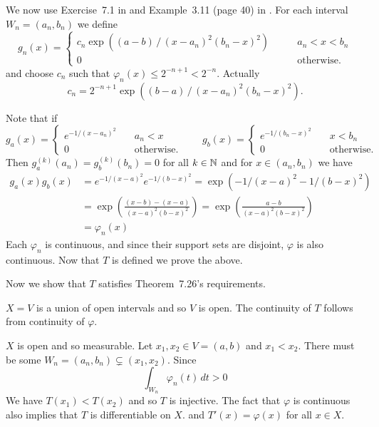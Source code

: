 \begin{enumerate}
We now use Exercise~7.1 in \cite{RudinPMA85}
and  Example~3.11 (page 40) in \cite{Gelb1996}.
For each interval \(W_n = (a_n,b_n)\) we define 
\begin{equation*}
g_n(x) = \left\{\begin{array}{ll}
c_n\exp\left((a-b) \,/\, (x-a_n)^2(b_n-x)^2\right) \qquad & a_n < x < b_n \\
0  & \mathrm{otherwise}.
\end{array}
\right.
\end{equation*}
and choose \(c_n\) such that \(\varphi_n(x) \leq  2^{-n+1 } < 2^{-n}\).
Actually 
\begin{equation*}
c_n =   2^{-n+1 } \exp\left((b-a) \,/\, (x-a_n)^2(b_n-x)^2\right).
\end{equation*}

Note that if
\begin{equation*}
g_a(x) = 
\left\{
\begin{array}{ll}
e^{-1/(x-a_n)^2} \quad & a_n < x  \\
0  & \mathrm{otherwise}.
\end{array}\right.
\qquad
g_b(x) = 
\left\{
\begin{array}{ll}
e^{-1/(b_n-x)^2} \quad &  x < b_n \\
0  & \mathrm{otherwise}.
\end{array}\right.
\end{equation*}
Then \(g_a^{(k)}(a_n) = g_b^{(k)}(b_n) = 0\) for all \(k\in\mathbb{N}\)
and for \(x\in (a_n,b_n)\) we have
\begin{align*}
g_a(x)g_b(x) 
&= e^{-1/(x-a)^2} e^{-1/(b-x)^2} 
 = \exp\left(- 1/(x-a)^2 - 1/(b-x)^2\right) \\
&= \exp\left(\frac{(x-b) - (x-a)}{(x-a)^2 (b-x)^2}\right)
 = \exp\left(\frac{a-b}{(x-a)^2 (b-x)^2}\right) \\
&= \varphi_n(x)
\end{align*}
Each \(\varphi_n\) is continuous, and since their support sets
are disjoint, \(\varphi\) is also continuous.
Now that $T$ is defined we prove the above.
\begin{itemize}


Now we show that $T$
satisfies Theorem~7.26's requirements.
\begin{itemize}

\(X=V\) is a union of open intervals and so $V$ is open.
The continuity of $T$ follows from continuity of \(\varphi\).

$X$ is open and so measurable.
Let \(x_1,x_2\in V=(a,b)\) and  \(x_1 < x_2\).
There must be some \(W_n = (a_n,b_n) \subsetneq (x_1,x_2)\).
Since 
\begin{equation*}
\int_{W_n} \varphi_n(t)\,dt > 0
\end{equation*}
We have \(T(x_1) < T(x_2)\) and so $T$ is injective.
The fact that \(\varphi\) is continuous
also implies that $T$ is differentiable on $X$.
and \(T'(x)=\varphi(x)\) for all \(x\in X\).


\end{itemize}
\end{itemize}
\end{enumerate}
